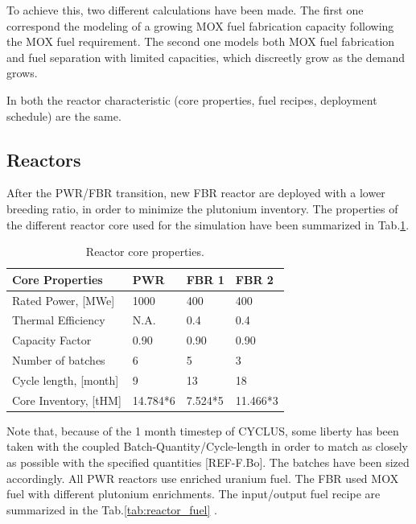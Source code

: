 \documentclass[12pt]{article}
\begin{document}
To achieve this, two different calculations have
been made. The first one correspond the modeling
of a growing MOX fuel fabrication capacity
following the MOX fuel requirement.
The second one models both MOX fuel fabrication
and fuel separation with limited capacities,
which discreetly grow as the demand grows.

In both the reactor characteristic (core
properties, fuel recipes, deployment schedule) are
the same.
\subsection{Reactors}
After the PWR/FBR transition, new FBR reactor are
deployed with a lower breeding ratio, in order to
minimize the plutonium inventory. The properties
of the different reactor core used for the
simulation have been summarized in
Tab.\ref{tab:reactor}.\\


\begin{table}[h!]
\centering
\begin{tabular}{llll}
\hline
Core Properties		&	PWR 	&	FBR 1	&	FBR 2 	\\
\hline
Rated Power, [MWe]	&	1000		&	400		&	400		\\
Thermal Efficiency	&	N.A.		&	0.4		&	0.4		\\
Capacity Factor		&	0.90		&	0.90		&	0.90		\\
Number of batches	&	6		&	5		&	3		\\
Cycle length, [month]&	9		&	13		&	18		\\
Core Inventory, [tHM]&	14.784*6	&	7.524*5	&	11.466*3	\\
\hline
\end{tabular}
\caption{Reactor core properties.}
\label{tab:reactor}
\end{table}
Note that, because of the 1 month timestep of
CYCLUS, some liberty has been taken with the
coupled Batch-Quantity/Cycle-length in order to
match as closely as possible with the specified
quantities [REF-F.Bo]. The batches have been sized
accordingly. All PWR reactors use enriched uranium
fuel. The FBR used MOX fuel with different
plutonium enrichments. The input/output fuel
recipe are summarized in the
Tab.\ref{tab:reactor_fuel} \cite{B.Feng_calculation}.
\end{document}

